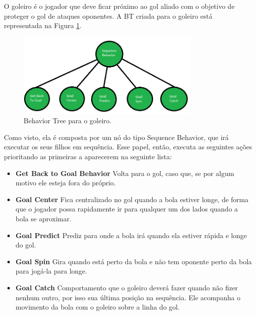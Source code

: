 \documentclass[10pt,fleqn,a4paper]{article}
\begin{document}
O goleiro é o jogador que deve ficar próximo ao gol aliado com o objetivo de proteger o gol de ataques oponentes. 
A BT criada para o goleiro está representada na Figura \ref{fig:goalier_bt}.

\begin{figure}[H]
	\centering
	\includegraphics[width=0.8\textwidth]{figures/Goalier_BT.png}
   	\caption{Behavior Tree para o goleiro.} \label{fig:goalier_bt}
\end{figure}

Como visto, ela é composta por um nó do tipo Sequence Behavior, que irá executar os seus filhos em sequência. Esse papel, então, executa as seguintes ações prioritando as primeiras a aparecerem na seguinte lista:

\begin{itemize}

\item \textbf{Get Back to Goal Behavior} Volta para o gol, caso que, se por algum motivo ele esteja fora do próprio.

\item \textbf{Goal Center} Fica centralizado no gol quando a bola estiver longe, de forma que o jogador possa rapidamente ir para qualquer um dos lados quando a bola se aproximar.

\item \textbf{Goal Predict} Prediz para onde a bola irá quando ela estiver rápida e longe do gol.

\item \textbf{Goal Spin} Gira quando está perto da bola e não tem oponente perto da bola para jogá-la para longe.

\item \textbf{Goal Catch} Comportamento que o goleiro deverá fazer quando não fizer nenhum outro, por isso sua última posição na sequência. Ele acompanha o movimento da bola com o goleiro sobre a linha do gol.

\end{itemize}
\end{document}

